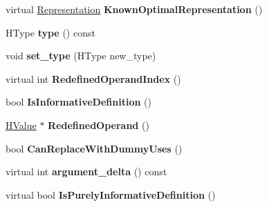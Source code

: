 \begin{DoxyCompactItemize}
\item 
\hypertarget{classv8_1_1internal_1_1_h_value_a1a9124133ef14af8191e77462be69046}{}virtual \hyperlink{classv8_1_1internal_1_1_representation}{Representation} {\bfseries Known\+Optimal\+Representation} ()\label{classv8_1_1internal_1_1_h_value_a1a9124133ef14af8191e77462be69046}

\item 
\hypertarget{classv8_1_1internal_1_1_h_value_a17fac9b0e7f989106d211e4f0195212f}{}H\+Type {\bfseries type} () const \label{classv8_1_1internal_1_1_h_value_a17fac9b0e7f989106d211e4f0195212f}

\item 
\hypertarget{classv8_1_1internal_1_1_h_value_a57a9f1c0433e823e48adaa392c80332e}{}void {\bfseries set\+\_\+type} (H\+Type new\+\_\+type)\label{classv8_1_1internal_1_1_h_value_a57a9f1c0433e823e48adaa392c80332e}

\item 
\hypertarget{classv8_1_1internal_1_1_h_value_ac971c53579e54bcbe2c56dc55a64d1c2}{}virtual int {\bfseries Redefined\+Operand\+Index} ()\label{classv8_1_1internal_1_1_h_value_ac971c53579e54bcbe2c56dc55a64d1c2}

\item 
\hypertarget{classv8_1_1internal_1_1_h_value_ae4a9a834b498e8a6cc3d2d13e6fcab7f}{}bool {\bfseries Is\+Informative\+Definition} ()\label{classv8_1_1internal_1_1_h_value_ae4a9a834b498e8a6cc3d2d13e6fcab7f}

\item 
\hypertarget{classv8_1_1internal_1_1_h_value_aa62dcb5ce1cba8b6a7fa5de865cba792}{}\hyperlink{classv8_1_1internal_1_1_h_value}{H\+Value} $\ast$ {\bfseries Redefined\+Operand} ()\label{classv8_1_1internal_1_1_h_value_aa62dcb5ce1cba8b6a7fa5de865cba792}

\item 
\hypertarget{classv8_1_1internal_1_1_h_value_ae88961ddb60ba63b489483abf7ac75c0}{}bool {\bfseries Can\+Replace\+With\+Dummy\+Uses} ()\label{classv8_1_1internal_1_1_h_value_ae88961ddb60ba63b489483abf7ac75c0}

\item 
\hypertarget{classv8_1_1internal_1_1_h_value_a523acb7587085f48f394100d98556ed8}{}virtual int {\bfseries argument\+\_\+delta} () const \label{classv8_1_1internal_1_1_h_value_a523acb7587085f48f394100d98556ed8}

\item 
\hypertarget{classv8_1_1internal_1_1_h_value_ac9ff17d1da66077ac69a3e2f10c18853}{}virtual bool {\bfseries Is\+Purely\+Informative\+Definition} ()\label{classv8_1_1internal_1_1_h_value_ac9ff17d1da66077ac69a3e2f10c18853}


\end{DoxyCompactItemize}

